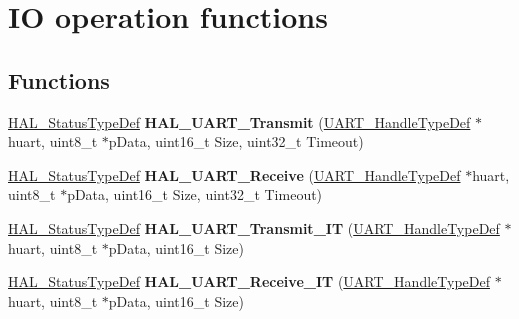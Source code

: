 \hypertarget{group___u_a_r_t___exported___functions___group2}{\section{I\-O operation functions}
\label{group___u_a_r_t___exported___functions___group2}
}
\subsection*{Functions}
\begin{DoxyCompactItemize}
\item 
\hypertarget{group___u_a_r_t___exported___functions___group2_ga210329848c1873957034e129ccf8944e}{\hyperlink{stm32l1xx__hal__def_8h_a63c0679d1cb8b8c684fbb0632743478f}{H\-A\-L\-\_\-\-Status\-Type\-Def} {\bfseries H\-A\-L\-\_\-\-U\-A\-R\-T\-\_\-\-Transmit} (\hyperlink{struct_u_a_r_t___handle_type_def}{U\-A\-R\-T\-\_\-\-Handle\-Type\-Def} $\ast$huart, uint8\-\_\-t $\ast$p\-Data, uint16\-\_\-t Size, uint32\-\_\-t Timeout)}\label{group___u_a_r_t___exported___functions___group2_ga210329848c1873957034e129ccf8944e}

\item 
\hypertarget{group___u_a_r_t___exported___functions___group2_gab868edc590e3b827a14528a25c999e2f}{\hyperlink{stm32l1xx__hal__def_8h_a63c0679d1cb8b8c684fbb0632743478f}{H\-A\-L\-\_\-\-Status\-Type\-Def} {\bfseries H\-A\-L\-\_\-\-U\-A\-R\-T\-\_\-\-Receive} (\hyperlink{struct_u_a_r_t___handle_type_def}{U\-A\-R\-T\-\_\-\-Handle\-Type\-Def} $\ast$huart, uint8\-\_\-t $\ast$p\-Data, uint16\-\_\-t Size, uint32\-\_\-t Timeout)}\label{group___u_a_r_t___exported___functions___group2_gab868edc590e3b827a14528a25c999e2f}

\item 
\hypertarget{group___u_a_r_t___exported___functions___group2_gaf223f2bcc2f5734f147cc5c626d757b0}{\hyperlink{stm32l1xx__hal__def_8h_a63c0679d1cb8b8c684fbb0632743478f}{H\-A\-L\-\_\-\-Status\-Type\-Def} {\bfseries H\-A\-L\-\_\-\-U\-A\-R\-T\-\_\-\-Transmit\-\_\-\-I\-T} (\hyperlink{struct_u_a_r_t___handle_type_def}{U\-A\-R\-T\-\_\-\-Handle\-Type\-Def} $\ast$huart, uint8\-\_\-t $\ast$p\-Data, uint16\-\_\-t Size)}\label{group___u_a_r_t___exported___functions___group2_gaf223f2bcc2f5734f147cc5c626d757b0}

\item 
\hypertarget{group___u_a_r_t___exported___functions___group2_gadc0c3ef2109881d011601f0d41e70e40}{\hyperlink{stm32l1xx__hal__def_8h_a63c0679d1cb8b8c684fbb0632743478f}{H\-A\-L\-\_\-\-Status\-Type\-Def} {\bfseries H\-A\-L\-\_\-\-U\-A\-R\-T\-\_\-\-Receive\-\_\-\-I\-T} (\hyperlink{struct_u_a_r_t___handle_type_def}{U\-A\-R\-T\-\_\-\-Handle\-Type\-Def} $\ast$huart, uint8\-\_\-t $\ast$p\-Data, uint16\-\_\-t Size)}\label{group___u_a_r_t___exported___functions___group2_gadc0c3ef2109881d011601f0d41e70e40}


\end{DoxyCompactItemize}
